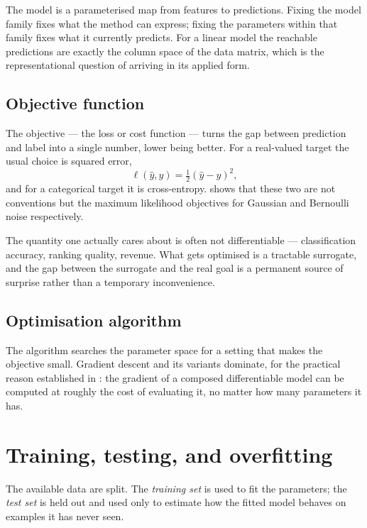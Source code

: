 The model is a parameterised map from features to predictions. Fixing the model
family fixes what the method can express; fixing the parameters within that
family fixes what it currently predicts. For a linear model the reachable
predictions are exactly the column space of the data matrix, which is the
representational question of  arriving in its
applied form.

\subsection{Objective function}

The objective --- the loss or cost function --- turns the gap between prediction
and label into a single number, lower being better. For a real-valued target the
usual choice is squared error,
\[
	\ell(\hat y,y)=\tfrac12(\hat y-y)^{2},
\]
and for a categorical target it is cross-entropy. 
shows that these two are not conventions but the maximum likelihood objectives
for Gaussian and Bernoulli noise respectively.

\begin{remark}
The quantity one actually cares about is often not differentiable ---
classification accuracy, ranking quality, revenue. What gets optimised is a
tractable surrogate, and the gap between the surrogate and the real goal is a
permanent source of surprise rather than a temporary inconvenience.
\end{remark}

\subsection{Optimisation algorithm}

The algorithm searches the parameter space for a setting that makes the
objective small. Gradient descent and its variants dominate, for the practical
reason established in : the gradient of a composed
differentiable model can be computed at roughly the cost of evaluating it, no
matter how many parameters it has.

\section{Training, testing, and overfitting}

The available data are split. The \emph{training set} is used to fit the
parameters; the \emph{test set} is held out and used only to estimate how the
fitted model behaves on examples it has never seen.

